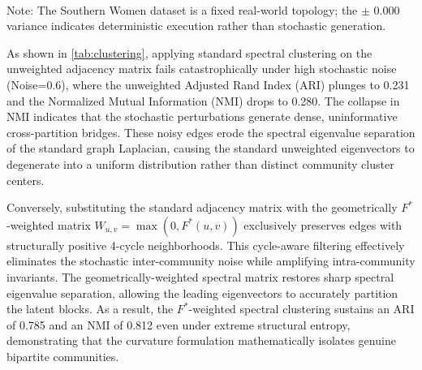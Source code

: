 \documentclass{siuro250211}
\begin{document}
\begin{table}[h]
\centering
\caption{Community Detection Performance (Adjusted Rand Index and NMI)}
\label{tab:clustering}
\vspace{1ex} \\
{\footnotesize *Note: The Southern Women dataset is a fixed real-world topology; the $\pm$ 0.000 variance indicates deterministic execution rather than stochastic generation.}
\end{table}

As shown in \cref{tab:clustering}, applying standard spectral clustering on the unweighted adjacency matrix fails catastrophically under high stochastic noise (Noise=0.6), where the unweighted Adjusted Rand Index (ARI) plunges to 0.231 and the Normalized Mutual Information (NMI) drops to 0.280. The collapse in NMI indicates that the stochastic perturbations generate dense, uninformative cross-partition bridges. These noisy edges erode the spectral eigenvalue separation of the standard graph Laplacian, causing the standard unweighted eigenvectors to degenerate into a uniform distribution rather than distinct community cluster centers.

Conversely, substituting the standard adjacency matrix with the geometrically $F^*$-weighted matrix $W_{u,v} = \max(0, F^*(u,v))$ exclusively preserves edges with structurally positive 4-cycle neighborhoods. This cycle-aware filtering effectively eliminates the stochastic inter-community noise while amplifying intra-community invariants. The geometrically-weighted spectral matrix restores sharp spectral eigenvalue separation, allowing the leading eigenvectors to accurately partition the latent blocks. As a result, the $F^*$-weighted spectral clustering sustains an ARI of 0.785 and an NMI of 0.812 even under extreme structural entropy, demonstrating that the curvature formulation mathematically isolates genuine bipartite communities.
\end{document}
